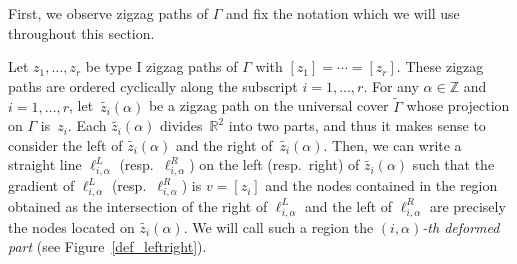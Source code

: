 \documentclass[pdftex]{sigma}%
\numberwithin{equation}{section}
\numberwithin{figure}{section}
\numberwithin{table}{section}
\newcommand{\ZZ}{\mathbb{Z}}
\newcommand{\RR}{\mathbb{R}}
\begin{document}
First, we observe zigzag paths of $\Gamma$ and fix the notation which we will use throughout this section.

\begin{observation}\label{obs_deformed_part}
Let $z_1,\dots,z_r$ be type I zigzag paths of $\Gamma$ with $[z_1]=\cdots=[z_r]$.
These zigzag paths are ordered cyclically along the subscript $i=1,\dots,r$.
For any $\alpha\in\ZZ$ and $i=1,\dots,r$, let~$\widetilde{z_i}(\alpha)$ be a zigzag path on the universal cover $\widetilde{\Gamma}$ whose projection on $\Gamma$ is~$z_i$.
Each $\widetilde{z_i}(\alpha)$ divides~$\RR^2$ into two parts, and thus it makes sense to consider the left of $\widetilde{z_i}(\alpha)$ and the right of~$\widetilde{z_i}(\alpha)$.
Then, we can write a straight line $\ell_{i,\alpha}^L$ (resp.~$\ell_{i,\alpha}^R$) on the left (resp.\ right) of $\widetilde{z_i}(\alpha)$ such that
the gradient of $\ell_{i,\alpha}^L$ (resp.~$\ell_{i,\alpha}^R$) is $v=[z_i]$ and the nodes contained in the region obtained as the intersection of the right of $\ell_{i,\alpha}^L$ and the left of $\ell_{i,\alpha}^R$ are precisely the nodes located on $\widetilde{z_i}(\alpha)$.
We will call such a region the \emph{$(i,\alpha)$-th deformed part} (see Figure~\ref{def_leftright}).

\begin{figure}[h!]\centering
{}
\end{figure}
\end{observation}
\end{document}
